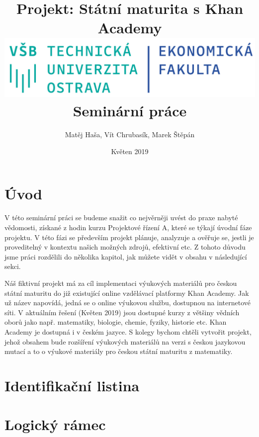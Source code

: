 \documentclass[12pt, a4paper]{report}
\author{Matěj Haša, Vít Chrubasík, Marek Štěpán}
\date{Květen 2019}
\title{Projekt: Státní maturita s Khan Academy\\\medskip
\large \includegraphics[width=\linewidth]{./images/skola_logo.png} Seminární práce}
\begin{document}
\maketitle
\tableofcontents
\thispagestyle{empty}



\chapter{Úvod}
\label{sec:org9e7b5df}
V této seminární práci se budeme snažit co nejvěrněji uvést do praxe nabyté vědomosti, získané z hodin kurzu Projektové řízení A, které se týkají úvodní fáze projektu. V této fázi se především projekt plánuje, analyzuje a ověřuje se, jestli je proveditelný v kontextu našich možných zdrojů, efektivní etc. Z tohoto důvodu jsme práci rozdělili do několika kapitol, jak můžete vidět v obsahu v následující sekci. 

Náš fiktivní projekt má za cíl implementaci výukových materiálů pro českou státní maturitu do již existující online vzdělávací platformy Khan Academy. Jak už název napovídá, jedná se o online výukovou službu, dostupnou na internetové síti. V aktuálním řešení (Květen 2019) jsou dostupné kurzy z většiny vědních oborů jako např. matematiky, biologie, chemie, fyziky, historie etc. Khan Academy je dostupná i v českém jazyce. S kolegy bychom chtěli vytvořit projekt, jehož obsahem bude rozšíření výukových materiálů na verzi s českou jazykovou mutací a to o výukové materiály pro českou státní maturitu z matematiky.
\chapter{Identifikační listina}
\label{sec:orgd6fca93}
\chapter{Logický rámec}
\label{sec:org6dcf399}
\end{document}

